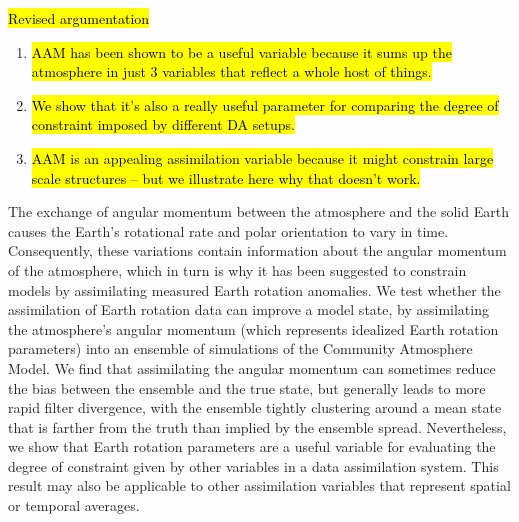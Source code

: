 \hl{Revised argumentation}
\begin{enumerate}
	\item \hl{AAM has been shown to be a useful variable because it sums up the atmosphere in just 3 variables that reflect a whole host of things.}
	\item \hl{We show that it's also a really useful parameter for comparing the degree of constraint imposed by different DA setups.}
	\item \hl{AAM is an appealing assimilation variable because it might constrain large scale structures -- but we illustrate here why that doesn't work.}
\end{enumerate}

The exchange of angular momentum between the atmosphere and the solid Earth causes the Earth's rotational rate and polar orientation to vary in time. 
Consequently, these variations contain information about the angular momentum of the atmosphere, which in turn is why it has been suggested to constrain models by assimilating measured Earth rotation anomalies. 
We test whether the assimilation of Earth rotation data can improve a model state, by assimilating the atmosphere's angular momentum (which represents idealized Earth rotation parameters) into an ensemble of simulations of the Community Atmosphere Model.
We find that assimilating the angular momentum can sometimes reduce the bias between the ensemble and the true state, but generally leads to more rapid filter divergence, with the ensemble tightly clustering around a mean state that is farther from the truth than implied by the ensemble spread. 
Nevertheless, we show that Earth rotation parameters are a useful variable for evaluating the degree of constraint given by other variables in a data assimilation system.  
This result may also be applicable to other assimilation variables that represent spatial or temporal averages. 
